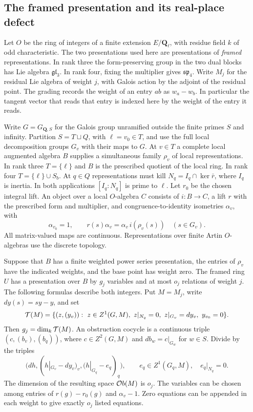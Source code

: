 \subsection{The framed presentation and its real-place defect}
\label{dp:section}

Let \(O\) be the ring of integers of a finite extension \(E/\mathbf Q_\ell\),
with residue field \(k\) of odd characteristic. The two presentations used
here are presentations of \emph{framed} representations. In rank three
the form-preserving group in the two dual blocks has Lie algebra
\(\mathfrak {gl}_3\). In rank four, fixing the multiplier gives
\(\mathfrak {sp}_4\). Write \(M_j\) for the residual Lie algebra of
weight \(j\), with Galois action by the adjoint of the residual point.
The grading records the weight of an entry \(ab\) as \(w_a-w_b\).
In particular the tangent vector that reads that entry is indexed here
by the weight of the entry it reads.

Write \(G=G_{\mathbf Q,S}\) for the Galois group unramified outside the
finite primes \(S\) and infinity. Partition \(S=T\sqcup Q\), with
\(\ell=v_0\in T\), and use the full local decomposition groups \(G_v\)
with their maps to \(G\). At \(v\in T\) a complete local augmented
algebra \(B\) supplies a simultaneous family \(\rho_v\) of local
representations. In rank three \(T=\{\ell\}\) and \(B\) is the
prescribed quotient of the local ring. In rank four
\(T=\{\ell\}\cup S_b\). At \(q\in Q\) representations must kill
\(N_q=I_q\cap\ker\bar r\), where \(I_q\) is inertia. In both
applications \([I_q:N_q]\) is prime to \(\ell\). Let \(r_0\) be the
chosen integral lift. An object over a local \(O\)-algebra \(C\)
consists of \(i:B\to C\), a lift \(r\) with the prescribed form and
multiplier, and congruence-to-identity isometries \(\alpha_v\), with
\[
 \alpha_{v_0}=1,\qquad
 r(s)\alpha_v=\alpha_v\,i(\rho_v(s))\quad(s\in G_v).
\]
All matrix-valued maps are continuous. Representations over finite
Artin \(O\)-algebras use the discrete topology.

\begin{proposition}\label{dp:relative}
Suppose that \(B\) has a finite weighted power series presentation, the
entries of \(\rho_v\) have the indicated weights, and the base point
has weight zero. The framed ring \(U\) has a presentation over \(B\)
by \(g_j\) variables and at most \(o_j\) relations of weight \(j\).
The following formulas describe both integers. Put \(M=M_j\), write
\(dy(s)=s y-y\), and set
\[
 {\cal T}(M)=\{(z,(y_v)):\ z\in Z^1(G,M),\
 z|_{N_q}=0,\ z|_{G_v}=dy_v,\ y_{v_0}=0\}.
\]
Then \(g_j=\dim_k{\cal T}(M)\). An obstruction cocycle is a continuous
triple \((c,(b_v),(b_q))\), where \(c\in Z^2(G,M)\) and
\(db_w=c|_{G_w}\) for \(w\in S\). Divide by the triples
\[
 \bigl(dh,(h|_{G_v}-dy_v)_v,(h|_{G_q}-e_q)_q\bigr),
 \qquad e_q\in Z^1(G_q,M),\quad e_q|_{N_q}=0.
\]
The dimension of the resulting space \({\cal O}b(M)\) is \(o_j\).
The variables can be chosen among entries of \(r(g)-r_0(g)\) and
\(\alpha_v-1\). Zero equations can be appended in each weight to
give exactly \(o_j\) listed equations.
\end{proposition}

